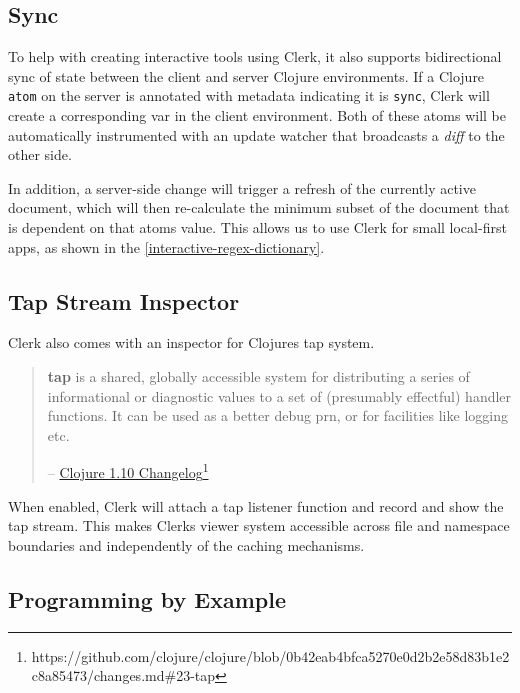 \documentclass[sigconf,screen]{acmart}
\newcommand{\passthrough}[1]{#1}
\begin{document}
\hypertarget{sync}{%
\subsection{Sync}\label{sync}}

To help with creating interactive tools using Clerk, it also supports bidirectional sync of state between the client and server Clojure environments. If a Clojure \passthrough{\lstinline!atom!} on the server is annotated with metadata indicating it is \passthrough{\lstinline!sync!}, Clerk will create a corresponding var in the client environment. Both of these atoms will be automatically instrumented with an update watcher that broadcasts a \emph{diff} to the other side.

In addition, a server-side change will trigger a refresh of the currently active document, which will then re-calculate the minimum subset of the document that is dependent on that atom\textquotesingle s value. This allows us to use Clerk for small local-first apps, as shown in the \autoref{interactive-regex-dictionary}.

\hypertarget{tap-stream-inspector}{%
\subsection{Tap Stream Inspector}\label{tap-stream-inspector}}

Clerk also comes with an inspector for Clojure\textquotesingle s tap system.

\begin{quote}
\textbf{tap} is a shared, globally accessible system for distributing a series of informational or diagnostic values to a set of (presumably effectful) handler functions. It can be used as a better debug prn, or for facilities like logging etc.

-- {\href{https://github.com/clojure/clojure/blob/0b42eab4bfca5270e0d2b2e58d83b1e2c8a85473/changes.md\#23-tap}{Clojure 1.10 Changelog}\footnote{https://github.com/clojure/clojure/blob/0b42eab4bfca5270e0d2b2e58d83b1e2c8a85473/changes.md\#23-tap}}
\end{quote}

When enabled, Clerk will attach a tap listener function and record and show the tap stream. This makes Clerk\textquotesingle s viewer system accessible across file and namespace boundaries and independently of the caching mechanisms.

\hypertarget{programming-by-example}{%
\subsection{Programming by Example}\label{programming-by-example}}
\end{document}
